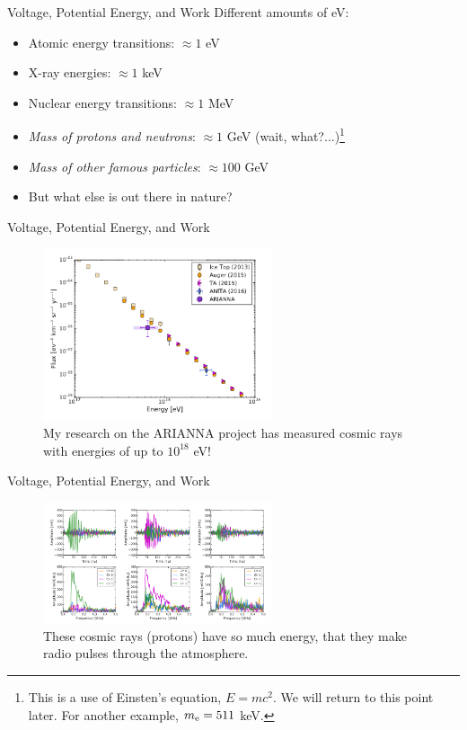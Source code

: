 \documentclass{beamer}
\begin{document}
\begin{frame}{Voltage, Potential Energy, and Work}
Different amounts of eV:
\begin{itemize}
\item Atomic energy transitions: $\approx 1$ eV
\item X-ray energies: $\approx 1$ keV
\item Nuclear energy transitions: $\approx 1$ MeV
\item \textit{Mass of protons and neutrons}: $\approx 1$ GeV (\alert{wait, what?}...)\footnote{This is a use of Einsten's equation, $E = mc^2$.  We will return to this point later.  For another example, $m_{\rm e} = 511$ keV.}
\item \textit{Mass of other famous particles}: $\approx 100$ GeV
\item But what else is out there in nature?
\end{itemize}
\end{frame}

\begin{frame}{Voltage, Potential Energy, and Work}
\begin{figure}
\centering
\includegraphics[width=0.6\textwidth]{figures/ARIANNA1.png}
\caption{\label{fig:arianna1} My research on the ARIANNA project has measured cosmic rays with energies of up to $10^{18}$ eV!}
\end{figure}
\end{frame}

\begin{frame}{Voltage, Potential Energy, and Work}
\begin{figure}
\centering
\includegraphics[width=0.6\textwidth]{figures/ARIANNA2.png}
\caption{\label{fig:arianna2} These cosmic rays (protons) have so much energy, that they make radio pulses through the atmosphere.}
\end{figure}
\end{frame}
\end{document}
